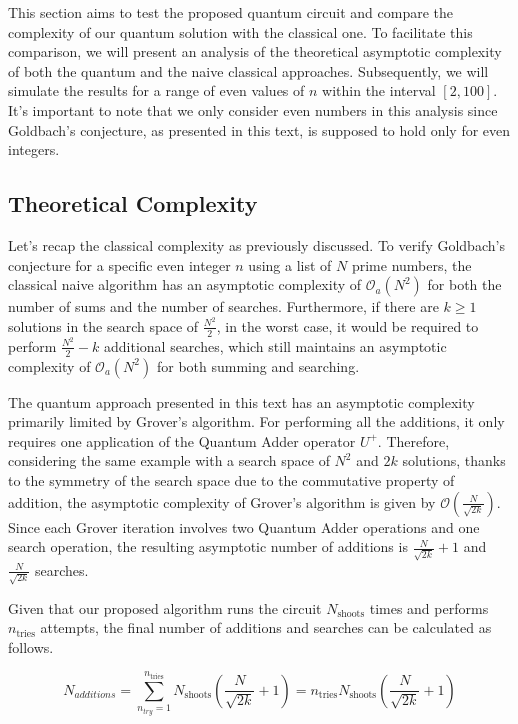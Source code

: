 \documentclass[12pt, a4paper]{article}
\begin{document}
    This section aims to test the proposed quantum circuit and compare the complexity of our quantum solution with the classical one. To facilitate this comparison, we will present an analysis of the theoretical asymptotic complexity of both the quantum and the naive classical approaches. Subsequently, we will simulate the results for a range of even values of $n$ within the interval $[2,100]$. It's important to note that we only consider even numbers in this analysis since Goldbach's conjecture, as presented in this text, is supposed to hold only for even integers.

    \subsection{Theoretical Complexity}

    Let's recap the classical complexity as previously discussed. To verify Goldbach's conjecture for a specific even integer $n$ using a list of $N$ prime numbers, the classical naive algorithm has an asymptotic complexity of $\mathcal{O}_a(N^2)$ for both the number of sums and the number of searches. Furthermore, if there are $k\geq 1$ solutions in the search space of $\frac{N^2}{2}$, in the worst case, it would be required to perform $\frac{N^2}{2}- k$ additional searches, which still maintains an asymptotic complexity of $\mathcal{O}_a(N^2)$ for both summing and searching.
    
    The quantum approach presented in this text has an asymptotic complexity primarily limited by Grover's algorithm. For performing all the additions, it only requires one application of the Quantum Adder operator $U^+$. Therefore, considering the same example with a search space of $N^2$ and $2k$ solutions, thanks to the symmetry of the search space due to the commutative property of addition, the asymptotic complexity of Grover's algorithm is given by $\mathcal{O}\left(\frac{N}{\sqrt{2k}}\right)$. Since each Grover iteration involves two Quantum Adder operations and one search operation, the resulting asymptotic number of additions is $\frac{N}{\sqrt{2k}} + 1$ and $\frac{N}{\sqrt{2k}}$ searches.

    Given that our proposed algorithm runs the circuit $N_{\text{shoots}}$ times and performs $n_{\text{tries}}$ attempts, the final number of additions and searches can be calculated as follows.

    \begin{equation}
        N_{additions} = \sum_{n_{try}=1}^{n_\text{tries}} N_\text{shoots} \left(\frac{N}{\sqrt{2k}} + 1\right) = n_\text{tries} N_\text{shoots} \left(\frac{N}{\sqrt{2k}} + 1\right)
    \end{equation}
\end{document}
